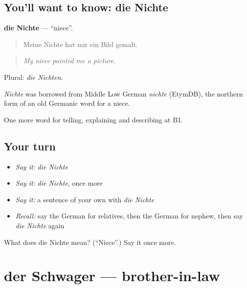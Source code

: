 \subsection*{You'll want to know: die Nichte}
\textbf{die Nichte} — \textquotedblleft{}niece\textquotedblright{}.

\begin{quote}
Meine Nichte hat mir ein Bild gemalt.
\end{quote}

\begin{quote}
\emph{My niece painted me a picture.}
\end{quote}

Plural: \emph{die Nichten}.

\begin{cousinweb}
\emph{Nichte} was borrowed from Middle Low German \emph{nichte} (EtymDB), the northern form of an old Germanic word for a niece.
\end{cousinweb}

\begin{grammarlens}[title={What you've built}]
One more word for telling, explaining and describing at B1.
\end{grammarlens}

\subsection*{Your turn}
\begin{itemize}
\raggedright
  \item \emph{Say it:} \emph{die Nichte}
  \item \emph{Say it:} \emph{die Nichte}, once more
  \item \emph{Say it:} a sentence of your own with \emph{die Nichte}
  \item \emph{Recall:} say the German for relatives, then the German for nephew, then say \emph{die Nichte} again
\end{itemize}

\begin{tcolorbox}[breakable,colback=teal!4,colframe=teal!35!black,title={Before you move on}]
What does die Nichte mean? (\textquotedblleft{}Niece\textquotedblright{}.) Say it once more.
\end{tcolorbox}
\section[der Schwager]{der Schwager — brother-in-law}

